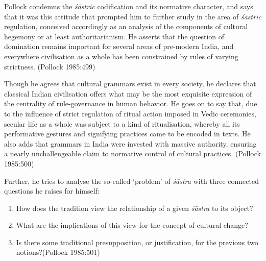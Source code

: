 Pollock condemns the {\sl śāstric} codification and its normative character, and says that it was this attitude that prompted him to further study in the area of {\sl śāstric} regulation, conceived accordingly as an analysis of the components of cultural hegemony or at least authoritarianism. He asserts that the question of domination remains important for several areas of pre-modern India, and everywhere civilisation as a whole has been constrained by rules of varying strictness. (Pollock 1985:499)

Though he agrees that cultural grammars exist in every society, he declares that classical Indian civilisation offers what may be the most exquisite expression of the centrality of rule-governance in human behavior. He goes on to say that, due to the influence of strict regulation of ritual action imposed in Vedic ceremonies, secular life as a whole was subject to a kind of ritualisation, whereby all its performative gestures and signifying practices came to be encoded in texts. He also adds that grammars in India were invested with massive authority, ensuring a nearly unchallengeable claim to normative control of cultural practices. (Pollock 1985:500)

Further, he tries to analyse the so-called `problem' of {\sl śāstra} with three connected questions he raises for himself:
\begin{enumerate}
\itemsep=1pt
\item How does the tradition view the relationship of a given {\sl śāstra} to its object?

\item What are the implications of this view for the concept of cultural change?

\item Is there some traditional presupposition, or justification, for the previous two notions?\hfill (Pollock 1985:501)
\end{enumerate}


